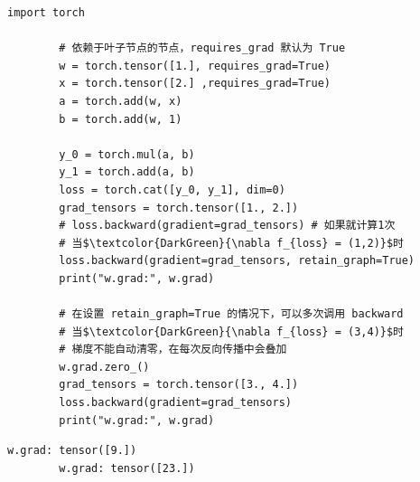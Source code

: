 \begin{example}
        \begin{lstlisting}[style=pythonstyle,mathescape=true]
        import torch
        
        # 依赖于叶子节点的节点，requires_grad 默认为 True
        w = torch.tensor([1.], requires_grad=True)
        x = torch.tensor([2.] ,requires_grad=True)
        a = torch.add(w, x)
        b = torch.add(w, 1)
        
        y_0 = torch.mul(a, b)
        y_1 = torch.add(a, b)
        loss = torch.cat([y_0, y_1], dim=0)
        grad_tensors = torch.tensor([1., 2.])
        # loss.backward(gradient=grad_tensors) # 如果就计算1次
        # 当$\textcolor{DarkGreen}{\nabla f_{loss} = (1,2)}$时
        loss.backward(gradient=grad_tensors, retain_graph=True)
        print("w.grad:", w.grad)
        
        # 在设置 retain_graph=True 的情况下，可以多次调用 backward
        # 当$\textcolor{DarkGreen}{\nabla f_{loss} = (3,4)}$时
        # 梯度不能自动清零，在每次反向传播中会叠加
        w.grad.zero_()
        grad_tensors = torch.tensor([3., 4.])
        loss.backward(gradient=grad_tensors)
        print("w.grad:", w.grad)  
        \end{lstlisting}     
        \begin{lstlisting}[style=demostyle,numbers=none]
        w.grad: tensor([9.])
        w.grad: tensor([23.])          
        \end{lstlisting}
                        
\end{example}




